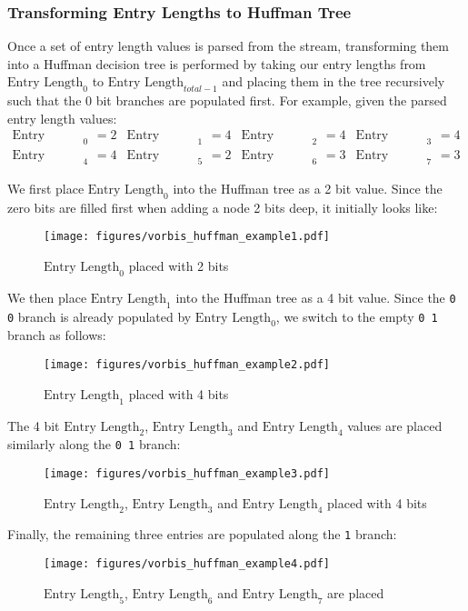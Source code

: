 \clearpage

\subsubsection{Transforming Entry Lengths to Huffman Tree}

Once a set of entry length values is parsed from the stream,
transforming them into a Huffman decision tree
is performed by taking our entry lengths from
$\text{Entry Length}_0$ to $\text{Entry Length}_{total - 1}$
and placing them in the tree recursively such that the 0 bit
branches are populated first.
For example, given the parsed entry length values:
\begin{align*}
\text{Entry Length}_0 &= 2 & \text{Entry Length}_1 &= 4 & \text{Entry Length}_2 &= 4 & \text{Entry Length}_3 &= 4 \\
\text{Entry Length}_4 &= 4 & \text{Entry Length}_5 &= 2 & \text{Entry Length}_6 &= 3 & \text{Entry Length}_7 &= 3
\end{align*}
\par
\noindent
We first place $\text{Entry Length}_0$ into the Huffman tree as a 2 bit value.
Since the zero bits are filled first when adding a node 2 bits deep,
it initially looks like:

\begin{figure}[h]
\texttt{[image: figures/vorbis\_huffman\_example1.pdf]}
\caption{$\text{Entry Length}_0$ placed with 2 bits}
\end{figure}
\par
\noindent
We then place $\text{Entry Length}_1$ into the Huffman tree as a 4 bit value.
Since the \texttt{0 0} branch is already populated by $\text{Entry Length}_0$,
we switch to the empty \texttt{0 1} branch as follows:
\begin{figure}[h]
\texttt{[image: figures/vorbis\_huffman\_example2.pdf]}
\caption{$\text{Entry Length}_1$ placed with 4 bits}
\end{figure}
\par
\noindent
The 4 bit $\text{Entry Length}_2$, $\text{Entry Length}_3$ and $\text{Entry Length}_4$
values are placed similarly along the \texttt{0 1} branch:
\begin{figure}[h]
\texttt{[image: figures/vorbis\_huffman\_example3.pdf]}
\caption{$\text{Entry Length}_2$, $\text{Entry Length}_3$ and $\text{Entry Length}_4$ placed with 4 bits}
\end{figure}
\par
\noindent
Finally, the remaining three entries are populated along the \texttt{1} branch:
\begin{figure}[h]
\texttt{[image: figures/vorbis\_huffman\_example4.pdf]}
\caption{$\text{Entry Length}_5$, $\text{Entry Length}_6$ and $\text{Entry Length}_7$ are placed}
\end{figure}

